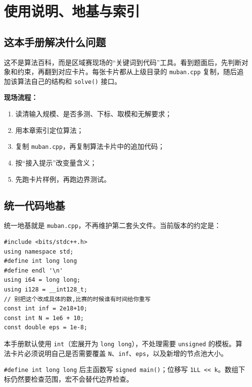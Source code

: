 \chapter{使用说明、地基与索引}

\section{这本手册解决什么问题}

这不是算法百科，而是区域赛现场的“关键词到代码”工具。看到题面后，先判断对象和约束，再翻到对应卡片。每张卡片都从上级目录的 \texttt{muban.cpp} 复制，随后追加该算法自己的结构和 \texttt{solve()} 接口。

\begin{card}
\textbf{现场流程：}
\begin{enumerate}
\item 读清输入规模、是否多测、下标、取模和无解要求；
\item 用本章索引定位算法；
\item 复制 \texttt{muban.cpp}，再复制算法卡片中的追加代码；
\item 按“接入提示”改变量含义；
\item 先跑卡片样例，再跑边界测试。
\end{enumerate}
\end{card}

\section{统一代码地基}

统一地基就是 \texttt{muban.cpp}，不再维护第二套头文件。当前版本的约定是：

\begin{lstlisting}[style=cpp]
#include <bits/stdc++.h>
using namespace std;
#define int long long
#define endl '\n'
using i64 = long long;
using i128 = __int128_t;
// 别把这个改成具体的数,比赛的时候谁有时间给你重写
const int inf = 2e18+10;
const int N = 1e6 + 10;
const double eps = 1e-8;
\end{lstlisting}

本手册默认使用 \texttt{int}（宏展开为 \texttt{long long}），不处理需要 \texttt{unsigned} 的模板。算法卡片必须说明自己是否需要覆盖 \texttt{N}、\texttt{inf}、\texttt{eps}，以及新增的节点池大小。

\begin{warnbox}
\texttt{\#define int long long} 后主函数写 \texttt{signed main()}；位移写 \texttt{1LL << k}。数组下标仍然要检查范围，宏不会替代边界检查。
\end{warnbox}

